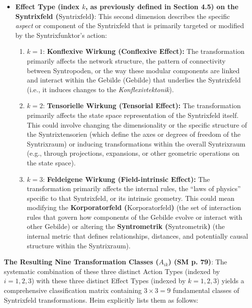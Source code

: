 \documentclass[12pt]{article}
\newcommand{\q}[1]{\enquote{#1}}
\newcommand{\syntrixfeld}{\text{Syntrixfeld}}
\newcommand{\syntrometrischesGebilde}{\text{Gebilde}}
\newcommand{\syntrometrik}{\text{Syntrometrik}}
\newcommand{\korporatorfeld}{\text{Korporatorfeld}}
\begin{document}
\begin{itemize}
    \item \textbf{Effect Type (index \( k \), as previously defined in Section 4.5) on the Syntrixfeld (\(\syntrixfeld\))}: This second dimension describes the specific \textit{aspect} or component of the Syntrixfeld that is primarily targeted or modified by the Syntrixfunktor's action:
    \begin{enumerate}
        \item \( k = 1 \): \textbf{Konflexive Wirkung (Conflexive Effect):} The transformation primarily affects the network structure, the pattern of connectivity between Syntropoden, or the way these modular components are linked and interact within the Gebilde (\(\syntrometrischesGebilde\)) that underlies the Syntrixfeld (i.e., it induces changes to the \textit{Konflexivtektonik}).
        \item \( k = 2 \): \textbf{Tensorielle Wirkung (Tensorial Effect):} The transformation primarily affects the state space representation of the Syntrixfeld itself. This could involve changing the dimensionality or the specific structure of the Syntrixtensorien (which define the axes or degrees of freedom of the Syntrixraum) or inducing transformations within the overall Syntrixraum (e.g., through projections, expansions, or other geometric operations on the state space).
        \item \( k = 3 \): \textbf{Feldeigene Wirkung (Field-intrinsic Effect):} The transformation primarily affects the internal rules, the \q{laws of physics} specific to that Syntrixfeld, or its intrinsic geometry. This could mean modifying the \textbf{Korporatorfeld (\(\korporatorfeld\))} (the set of interaction rules that govern how components of the Gebilde evolve or interact with other Gebilde) or altering the \textbf{Syntrometrik (\(\syntrometrik\))} (the internal metric that defines relationships, distances, and potentially causal structure within the Syntrixraum).
    \end{enumerate}
\end{itemize}

\textbf{The Resulting Nine Transformation Classes (\( A_{ik} \)) (SM p. 79)}:
The systematic combination of these three distinct Action Types (indexed by \( i=1,2,3 \)) with these three distinct Effect Types (indexed by \( k=1,2,3 \)) yields a comprehensive classification matrix containing \( 3 \times 3 = 9 \) fundamental classes of Syntrixfeld transformations. Heim explicitly lists them as follows:
\end{document}
